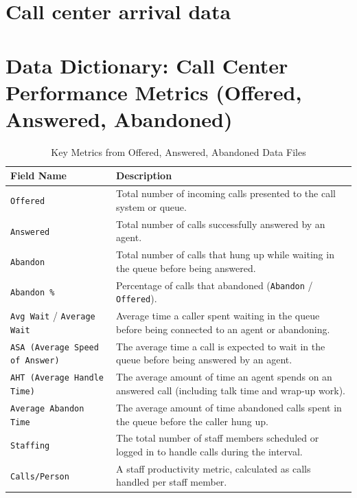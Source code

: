 \documentclass[manuscript,screen,authorversion]{acmart}
\begin{document}
\section{Call center arrival data }\label{apx-sec-call-center-ts-analysis}


\section*{Data Dictionary: Call Center Performance Metrics (Offered, Answered, Abandoned)}\label{apx-callcenterdata}

\begin{table}[h!]
    \centering
    \caption{Key Metrics from Offered, Answered, Abandoned Data Files}
    \label{tab:data_dictionary_offered_answered}
    \begin{tabular}{|l|p{10cm}|}
        \hline
        \textbf{Field Name} & \textbf{Description} \\
        \hline
        \texttt{Offered} & Total number of incoming calls presented to the call system or queue. \\
        \hline
        \texttt{Answered} & Total number of calls successfully answered by an agent. \\
        \hline
        \texttt{Abandon} & Total number of calls that hung up while waiting in the queue before being answered. \\
        \hline
        \texttt{Abandon \%} & Percentage of calls that abandoned (\texttt{Abandon} / \texttt{Offered}). \\
        \hline
        \texttt{Avg Wait} / \texttt{Average Wait} & Average time a caller spent waiting in the queue before being connected to an agent or abandoning. \\
        \hline
        \texttt{ASA (Average Speed of Answer)} & The average time a call is expected to wait in the queue before being answered by an agent. \\
        \hline
        \texttt{AHT (Average Handle Time)} & The average amount of time an agent spends on an answered call (including talk time and wrap-up work). \\
        \hline
        \texttt{Average Abandon Time} & The average amount of time abandoned calls spent in the queue before the caller hung up. \\
        \hline
        \texttt{Staffing} & The total number of staff members scheduled or logged in to handle calls during the interval. \\
        \hline
        \texttt{Calls/Person} & A staff productivity metric, calculated as calls handled per staff member. \\
        \hline
    \end{tabular}
\end{table}
\end{document}

